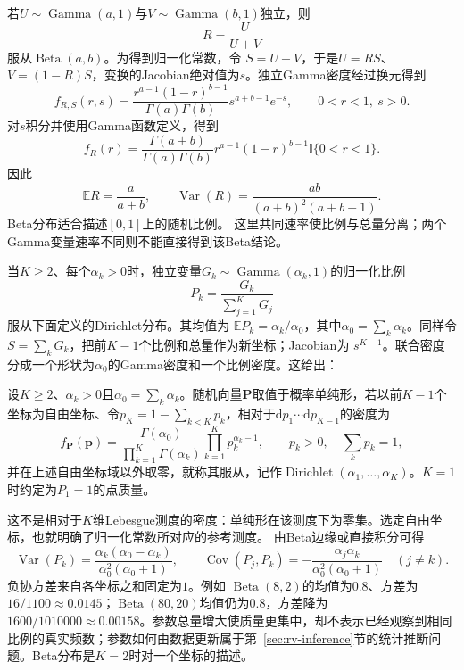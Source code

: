 若\(U\sim\operatorname{Gamma}(a,1)\)与\(V\sim\operatorname{Gamma}(b,1)\)独立，则
\[ R=\frac{U}{U+V} \]
服从\(\operatorname{Beta}(a,b)\)。为得到归一化常数，令
\(S=U+V\)，于是\(U=RS\)、\(V=(1-R)S\)，变换的Jacobian绝对值为\(s\)。独立Gamma密度经过换元得到
\[
  f_{R,S}(r,s)
  =
  \frac{r^{a-1}(1-r)^{b-1}}{\Gamma(a)\Gamma(b)}
  s^{a+b-1}e^{-s},
  \qquad 0<r<1,\ s>0.
\]
对\(s\)积分并使用Gamma函数定义，得到
\[
  f_R(r)
  =
  \frac{\Gamma(a+b)}{\Gamma(a)\Gamma(b)}
  r^{a-1}(1-r)^{b-1}\mathbb{I}\{0<r<1\}.
\]
因此
\[
  \mathbb{E}R=\frac{a}{a+b},\qquad
  \operatorname{Var}(R)=
  \frac{ab}{(a+b)^2(a+b+1)}.
\]
Beta分布适合描述\([0,1]\)上的随机比例。
这里共同速率使比例与总量分离；两个Gamma变量速率不同则不能直接得到该Beta结论。

当\(K\geq2\)、每个\(\alpha_k>0\)时，独立变量\(G_k\sim\operatorname{Gamma}(\alpha_k,1)\)的归一化比例
\[ P_k=\frac{G_k}{\sum_{j=1}^{K}G_j} \]
服从下面定义的Dirichlet分布。其均值为
\(\mathbb{E}P_k=\alpha_k/\alpha_0\)，其中\(\alpha_0=\sum_k\alpha_k\)。同样令
\(S=\sum_kG_k\)，把前\(K-1\)个比例和总量作为新坐标；Jacobian为
\(s^{K-1}\)。联合密度分成一个形状为\(\alpha_0\)的Gamma密度和一个比例密度。这给出：
\begin{definition}[Dirichlet分布]
  \label{def:probability-dirichlet-distribution}
设\(K\geq2\)、\(\alpha_k>0\)且\(\alpha_0=\sum_k\alpha_k\)。随机向量\(\bm P\)取值于概率单纯形，若以前\(K-1\)个坐标为自由坐标、令\(p_K=1-\sum_{k<K}p_k\)，相对于\(\mathrm dp_1\cdots\mathrm dp_{K-1}\)的密度为
\[
  f_{\bm{P}}(\bm{p})
  =
  \frac{\Gamma(\alpha_0)}
       {\prod_{k=1}^{K}\Gamma(\alpha_k)}
  \prod_{k=1}^{K}p_k^{\alpha_k-1},
  \qquad p_k>0,\quad\sum_kp_k=1,
\]
并在上述自由坐标域以外取零，就称其服从，记作\(\operatorname{Dirichlet}(\alpha_1,\ldots,\alpha_K)\)。\(K=1\)时约定为\(P_1=1\)的点质量。
\end{definition}
这不是相对于\(K\)维Lebesgue测度的密度：单纯形在该测度下为零集。选定自由坐标，也就明确了归一化常数所对应的参考测度。
由Beta边缘或直接积分可得
\[
  \operatorname{Var}(P_k)
  =\frac{\alpha_k(\alpha_0-\alpha_k)}
        {\alpha_0^2(\alpha_0+1)},\qquad
  \operatorname{Cov}(P_j,P_k)
  =-\frac{\alpha_j\alpha_k}
         {\alpha_0^2(\alpha_0+1)}
  \quad(j\neq k).
\]
负协方差来自各坐标之和固定为\(1\)。例如
\(\operatorname{Beta}(8,2)\)的均值为\(0.8\)、方差为
\(16/1100\approx0.0145\)；\(\operatorname{Beta}(80,20)\)均值仍为\(0.8\)，方差降为
\(1600/1010000\approx0.00158\)。参数总量增大使质量更集中，却不表示已经观察到相同比例的真实频数；参数如何由数据更新属于第~\ref{sec:rv-inference}节的统计推断问题。Beta分布是\(K=2\)时对一个坐标的描述。

